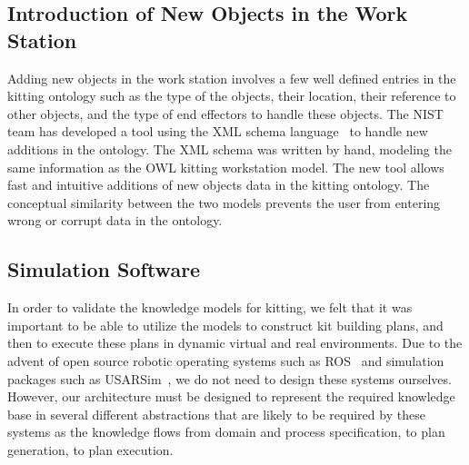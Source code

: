\documentclass[final,3p,12pt]{elsarticle}
\begin{document}
\subsection{Introduction of New Objects in the Work Station}
Adding new objects in the work station involves a few well defined entries in the kitting ontology such as the type of the objects, their location, their reference to other objects, and the type of end effectors to handle these objects. The NIST team has developed a tool using the XML schema language~\cite{XMLschemaStructures} to handle new additions in the ontology. The XML schema was written by hand, modeling the same information as the OWL kitting workstation model. The new tool allows fast and intuitive additions of new objects data in the kitting ontology. The conceptual similarity between the two models prevents the user from entering wrong or corrupt data in the ontology.



%

\subsection{Simulation Software}
In order to validate the knowledge models for kitting, we felt that it was important to be able to utilize the models to construct kit building plans, and then to execute these plans in dynamic virtual and real environments. Due to the advent of open source robotic operating systems such as ROS~\cite{ROS} and simulation packages such as USARSim~\cite{Balakirsky.USARSIM.2007}, we do not need to design these systems ourselves. However, our architecture must be designed to represent the required knowledge base in several different abstractions that are likely to be required by these systems as the knowledge flows from domain and process specification, to plan generation, to plan execution.
\end{document}
